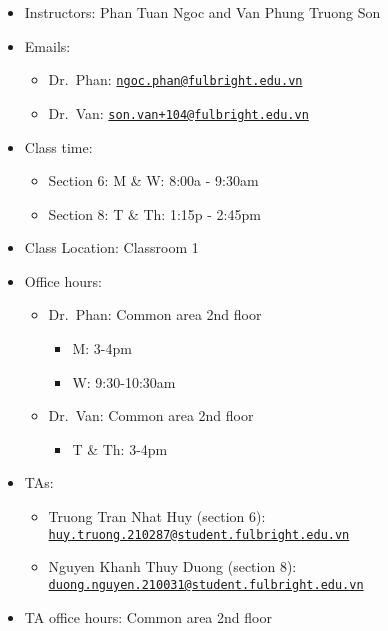 \documentclass[
]{article}
\providecommand{\tightlist}{%
  \setlength{\itemsep}{0pt}\setlength{\parskip}{0pt}}
\begin{document}
\begin{itemize}
\tightlist
\item
  Instructors: Phan Tuan Ngoc and Van Phung Truong Son
\item
  Emails:

  \begin{itemize}
  \tightlist
  \item
    Dr.~Phan: \href{mailto:ngoc.phan@fulbright.edu.vn}{\nolinkurl{ngoc.phan@fulbright.edu.vn}}
  \item
    Dr.~Van: \href{mailto:son.van+104@fulbright.edu.vn}{\nolinkurl{son.van+104@fulbright.edu.vn}}
  \end{itemize}
\item
  Class time:

  \begin{itemize}
  \tightlist
  \item
    Section 6: M \& W: 8:00a - 9:30am
  \item
    Section 8: T \& Th: 1:15p - 2:45pm
  \end{itemize}
\item
  Class Location: Classroom 1
\item
  Office hours:

  \begin{itemize}
  \tightlist
  \item
    Dr.~Phan: Common area 2nd floor

    \begin{itemize}
    \tightlist
    \item
      M: 3-4pm
    \item
      W: 9:30-10:30am
    \end{itemize}
  \item
    Dr.~Van: Common area 2nd floor

    \begin{itemize}
    \tightlist
    \item
      T \& Th: 3-4pm
    \end{itemize}
  \end{itemize}
\item
  TAs:

  \begin{itemize}
  \tightlist
  \item
    Truong Tran Nhat Huy (section 6): \href{mailto:huy.truong.210287@student.fulbright.edu.vn}{\nolinkurl{huy.truong.210287@student.fulbright.edu.vn}}
  \item
    Nguyen Khanh Thuy Duong (section 8): \href{mailto:duong.nguyen.210031@student.fulbright.edu.vn}{\nolinkurl{duong.nguyen.210031@student.fulbright.edu.vn}}
  \end{itemize}
\item
  TA office hours: Common area 2nd floor


\end{itemize}
\end{document}
